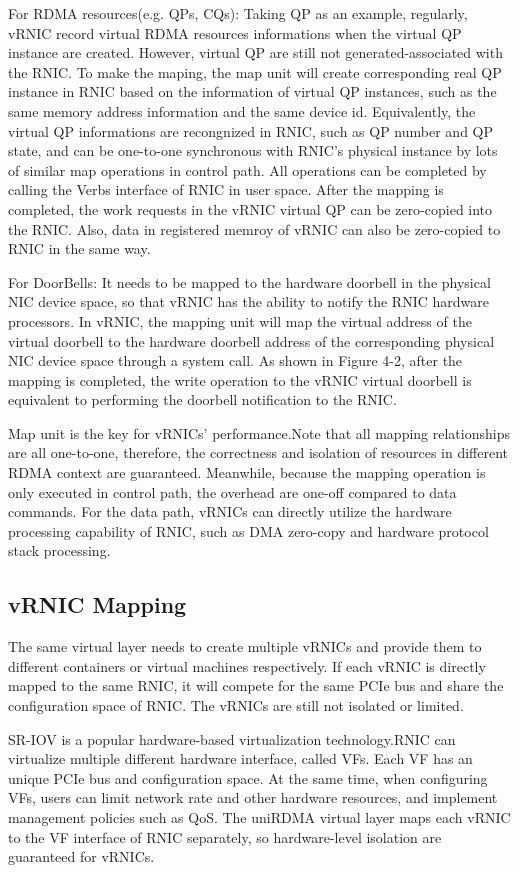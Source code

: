 For RDMA resources(e.g. QPs, CQs): Taking QP as an example, regularly, vRNIC record virtual RDMA resources informations when the virtual QP instance are created. However, virtual QP are still not generated-associated with the RNIC. To make the maping, the map unit will create corresponding real QP instance in RNIC based on the information of virtual QP instances, such as the same memory address information and the same device id. Equivalently, the virtual QP informations are recongnized in RNIC, such as QP number and QP state, and can be one-to-one synchronous with RNIC's  physical instance by lots of similar map operations in control path. All operations can be completed by calling the Verbs interface of RNIC in user space. After the mapping is completed, the work requests in the vRNIC virtual QP can be zero-copied into the RNIC. Also, data in registered memroy of vRNIC can also be zero-copied to RNIC in the same way. 

For DoorBells: It needs to be mapped to the hardware doorbell in the physical NIC device space, so that vRNIC has the ability to notify the RNIC hardware processors. In vRNIC, the mapping unit will map the virtual address of the virtual doorbell to the hardware doorbell address of the corresponding physical NIC device space through a system call. As shown in Figure 4-2, after the mapping is completed, the write operation to the vRNIC virtual doorbell is equivalent to performing the doorbell notification to the RNIC.

Map unit is the key for vRNICs' performance.Note that all mapping relationships are all one-to-one, therefore, the correctness and isolation of resources in different RDMA context are guaranteed. Meanwhile, because the mapping operation is only executed in control path, the overhead are one-off compared to data commands. For the data path, vRNICs can directly utilize the hardware processing capability of RNIC, such as DMA zero-copy and hardware protocol stack processing.

\subsection{vRNIC Mapping}
The same virtual layer needs to create multiple vRNICs and provide them to different containers or virtual machines respectively. If each vRNIC is directly mapped to the same RNIC, it will compete for the same PCIe bus and share the configuration space of RNIC. The vRNICs are still not isolated or limited.

SR-IOV is a popular hardware-based virtualization technology.RNIC can virtualize multiple different hardware interface, called VFs. Each VF has an unique PCIe bus and configuration space. At the same time, when configuring VFs, users can limit network rate and other hardware resources, and implement management policies such as QoS. The uniRDMA virtual layer maps each vRNIC to the VF interface of RNIC separately, so hardware-level isolation are guaranteed for vRNICs.

